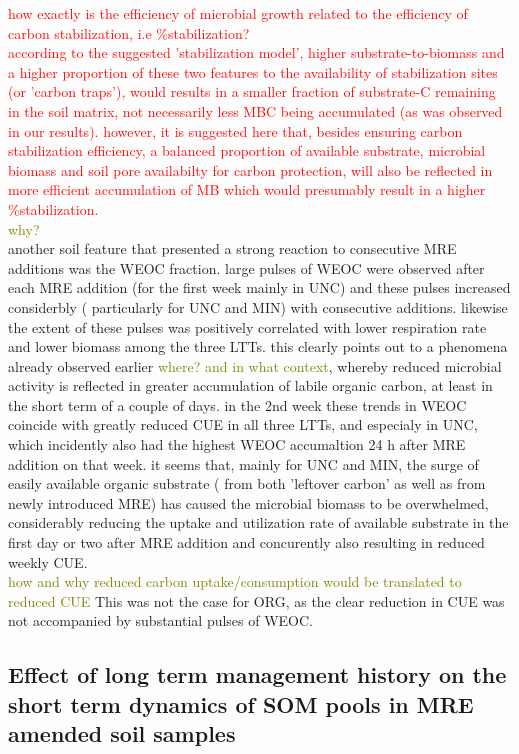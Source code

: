 \documentclass[12pt]{report}
\newcommand{\myRed}[1]{\textcolor{red}{#1}} %
\newcommand{\myGreen}[1]{\textcolor{olive}{#1}} %
\begin{document}
\myRed{how exactly is the efficiency of microbial growth related to the efficiency of carbon stabilization, i.e \%stabilization?\\
	according to the suggested 'stabilization model', higher substrate-to-biomass and a higher proportion of these two features to the availability of stabilization sites (or 'carbon traps'), would results in a smaller fraction of substrate-C remaining in the soil matrix, not necessarily less MBC being accumulated (as was observed in our results). however, it is suggested here that, besides ensuring carbon stabilization efficiency, a balanced proportion of available substrate, microbial biomass and soil pore availabilty for carbon protection, will also be reflected in more efficient accumulation of MB which would presumably result in a higher \%stabilization.}\\
\myGreen{why?}\\
another soil feature that presented a strong reaction to consecutive MRE additions was the WEOC fraction. large pulses of WEOC were observed after each MRE addition (for the first week mainly in UNC) and these pulses increased considerbly ( particularly for UNC and MIN) with consecutive additions. likewise the extent of these pulses was positively correlated with lower respiration rate and lower biomass among the three LTTs. this clearly points out to a phenomena already observed earlier \myGreen{where? and in what context}, whereby reduced microbial activity is reflected in greater accumulation of labile organic carbon, at least in the short term of a couple of days. in the 2nd week these trends in WEOC coincide with greatly reduced CUE in all three LTTs, and especialy in UNC, which incidently also had the highest WEOC accumaltion 24 h after MRE addition on that week. it seems that, mainly for UNC and MIN, the surge of easily available organic substrate ( from both 'leftover carbon' as well as from newly introduced MRE) has caused the microbial biomass to be overwhelmed, considerably reducing the uptake and utilization rate of available substrate in the first day or two after MRE addition and concurently also resulting in reduced weekly CUE.\\
\myGreen{how and why reduced carbon uptake/consumption would be translated to reduced CUE }
This was not the case for ORG, as the clear reduction in CUE was not accompanied by substantial pulses of WEOC. 

\subsection{Effect of long term management history on the short term dynamics of SOM pools in MRE amended soil samples} 
\end{document}
